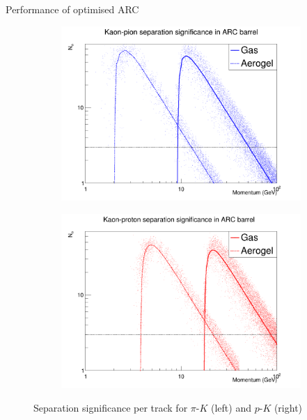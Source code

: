 \documentclass{beamer}
\begin{document}
\begin{frame}{Performance of optimised ARC}
  \begin{figure}
    \centering
    \vspace{-0.2cm}
    \begin{subfigure}{0.5\textwidth}
      \includegraphics[width = 1.0\textwidth]{Plots/Significance_Scatter_PionKaon.png}
    \end{subfigure}%
    \begin{subfigure}{0.5\textwidth}
      \includegraphics[width = 1.0\textwidth]{Plots/Significance_Scatter_ProtonKaon.png}
    \end{subfigure}
    \vspace{-0.4cm}
    \caption{Separation significance per track for $\pi$-$K$ (left) and $p$-$K$ (right)}

\end{figure}
\end{frame}
\end{document}
